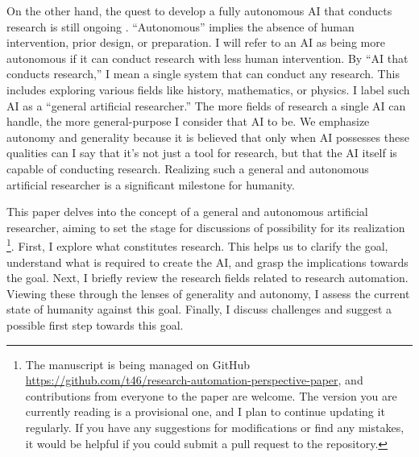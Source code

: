 On the other hand, the quest to develop a fully autonomous AI that conducts research is still ongoing \cite{zenil2023}. ``Autonomous'' implies the absence of human intervention, prior design, or preparation. I will refer to an AI as being more autonomous if it can conduct research with less human intervention. By ``AI that conducts research,'' I mean a single system that can conduct any research. This includes exploring various fields like history, mathematics, or physics. I label such AI as a ``general artificial researcher.'' The more fields of research a single AI can handle, the more general-purpose I consider that AI to be. 
We emphasize autonomy and generality because it is believed that only when AI possesses these qualities can I say that it's not just a tool for research, but that the AI itself is capable of conducting research. Realizing such a general and autonomous artificial researcher is a significant milestone for humanity.

This paper delves into the concept of a general and autonomous artificial researcher, aiming to set the stage for discussions of possibility for its realization \footnote{
The manuscript is being managed on GitHub \url{https://github.com/t46/research-automation-perspective-paper}, and contributions from everyone to the paper are welcome. The version you are currently reading is a provisional one, and I plan to continue updating it regularly. If you have any suggestions for modifications or find any mistakes, it would be helpful if you could submit a pull request to the repository.
}. 
First, I explore what constitutes research. This helps us to clarify the goal, understand what is required to create the AI, and grasp the implications towards the goal. Next, I briefly review the research fields related to research automation. Viewing these through the lenses of generality and autonomy, I assess the current state of humanity against this goal. Finally, I discuss challenges and suggest a possible first step towards this goal.


